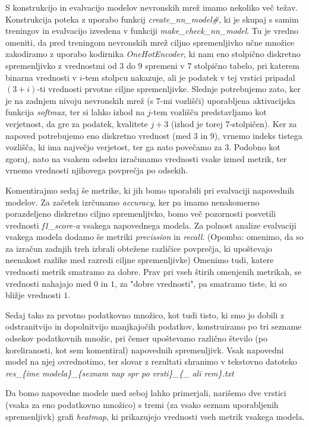 \documentclass{article}
\begin{document}
S konstrukcijo in evalvacijo modelov nevronskih mrež imamo nekoliko več težav. Konstrukcija poteka z uporabo funkcij \textit{create\_nn\_model\#}, ki je skupaj s samim treningov in evalvacijo izvedena v funkciji \textit{make\_check\_nn\_model}.
Tu je vredno omeniti, da pred treningom nevronskih mrež ciljno spremenljivko učne množice zakodiramo z uporabo kodirnika \textit{OneHotEncoder}, ki nam eno stolpično diskretno spremenljivko z vrednostmi od $3$ do $9$ spremeni v $7$ stolpično tabelo, pri katerem binarna vrednosti v $i$-tem stolpcu nakazuje, ali je podatek v tej vrstici pripadal $(3 + i)$-ti vrednosti prvotne ciljne spremenljivke. 
Slednje potrebujemo zato, ker je na zadnjem nivoju nevronskih mrež (s $7$-mi vozlišči) uporabljena aktivacijska funkcija \textit{softmax}, ter si lahko izhod na $j$-tem vozlišču predstavljamo kot verjetnost, da gre za podatek, kvalitete $j+3$ (izhod je torej $7$-stolpičen).  
Ker za napoved potrebujemo eno diskretno vrednost (med $3$ in $9$), vrnemo indeks tistega vozlišča, ki ima največjo verjetost, ter ga nato povečamo za $3$.
Podobno kot zgoraj, nato na vsakem odseku izračunamo vrednosti vsake izmed metrik, ter vrnemo vrednosti njihovega povprečja po odsekih.

Komentirajmo sedaj še metrike, ki jih bomo uporabili pri evalvaciji napovednih modelov. Za začetek izrčunamo \textit{accuracy}, ker pa imamo nenakomerno porazdeljeno diskretno ciljno spremenljivko, bomo več pozornosti posvetili vrednosti \textit{f1\_score-a} vsakega napovednega modela. 
Za polnost analize evalvaciji vsakega modela dodamo še metriki \textit{precission} in \textit{recall}. (Opomba: omenimo, da so za izračun zadnjih treh izbrali obtežene različice povprečja, ki upoštevajo neenakost razlike med razredi ciljne spremenljivke)
Omenimo tudi, katere vrednosti metrik smatramo za dobre. Prav pri vseh štirih omenjenih metrikah, se vrednosti nahajajo med $0$ in $1$, za "dobre vrednosti", pa smatramo tiste, ki so bližje vrednosti $1$.

Sedaj tako za prvotno podatkovno množico, kot tudi tisto, ki smo jo dobili z odstranitvijo in dopolnitvijo manjkajočih podatkov, konstruiramo po tri sezname odsekov podatkovnih množic, pri čemer upoštevamo različno število (po koreliranosti, kot sem komentiral) napovednih spremenljivk. 
Vsak napovedni model na njej ovrednotimo, ter slovar z rezultati shranimo v tekstovno datoteko \textit{res\_\{ime modela\}\_\{seznam nap spr po vrsti\}\_\{\_ ali rem\}.txt}

Da bomo napovedne modele med seboj lahko primerjali, narišemo dve vrstici (vsaka za eno podatkovno množico) s tremi (za vsako seznam uporabljenih spremenljivk) grafi \textit{heatmap}, ki prikazujejo vrednosti vseh metrik vsakega modela.
\end{document}
